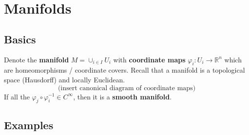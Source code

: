 \documentclass[12pt]{article} %
\begin{document}
\section{Manifolds}

\subsection{Basics}

Denote the \textbf{manifold} $M = \cup_{i \in I} U_i$ with \textbf{coordinate maps} $\varphi_i: U_i \rightarrow \mathbb{R}^n$ which are homeomorphisms / coordinate covers. Recall that a manifold is a topological space (Hausdorff) and locally Euclidean. 
\begin{equation}
\text{(insert canonical diagram of coordinate maps)}%
\end{equation}
If all the $\varphi_j \circ \varphi_i^{-1} \in C^\infty$, then it is a \textbf{smooth manifold}. 


\subsection{Examples}
\end{document}
